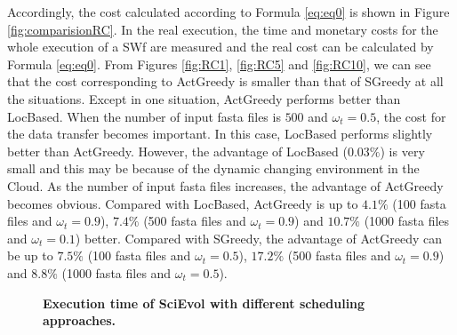 Accordingly, the cost calculated according to Formula \ref{eq:eq0} is shown in Figure \ref{fig:comparisionRC}. In the real execution, the time and monetary costs for the whole execution of a SWf are measured and the real cost can be calculated by Formula \ref{eq:eq0}. From Figures \ref{fig:RC1}, \ref{fig:RC5} and \ref{fig:RC10}, we can see that the cost corresponding to ActGreedy is smaller than that of SGreedy at all the situations. Except in one situation, ActGreedy performs better than LocBased. When the number of input fasta files is $500$ and $\omega_t=0.5$, the cost for the data transfer becomes important. In this case, LocBased performs slightly better than ActGreedy. However, the advantage of LocBased ($0.03\%$) is very small and this may be because of the dynamic changing environment in the Cloud. As the number of input fasta files increases, the advantage of ActGreedy becomes obvious. Compared with LocBased, ActGreedy is up to $4.1\%$ (100 fasta files and $\omega_t = 0.9$), $7.4\%$ (500 fasta files and $\omega_t = 0.9$) and $10.7\%$ (1000 fasta files and $\omega_t = 0.1$) better. Compared with SGreedy, the advantage of ActGreedy can be up to $7.5\%$ (100 fasta files and $\omega_t = 0.5$), $17.2\%$ (500 fasta files and $\omega_t = 0.9$) and $8.8\%$ (1000 fasta files and $\omega_t = 0.5$).

\begin{figure}[htbp]
\begin{centering}
\caption{\textbf{Execution time of SciEvol with different scheduling approaches.}}\label{fig:MOET}
\end{centering}
\end{figure}


